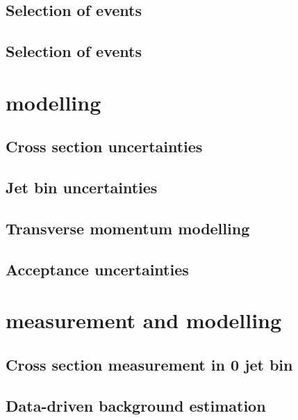 \documentclass[hyper,linkcolor=blue]{mythesis}
\begin{document}
\begin{mainmatter}
    \section{Selection of \WW events}
      \label{sec:presel}
      
    \section{Selection of \HWW events}
      \label{sec:signalregions}
      

  \chapter{\ggH modelling}
    \label{chap:signal}
    
    \section{Cross section uncertainties}
      \label{sec:ggf_xs}
      
    \section{Jet bin uncertainties}
      \label{sec:ggf_jetbin}
      
    \section{Transverse momentum modelling}
      \label{sec:ggf_pt}
      
    \section{Acceptance uncertainties}
      \label{sec:ggf_acc}
      

  \chapter{\WW measurement and modelling}
    \label{chap:ww}
    
    \section{Cross section measurement in 0 jet bin}
      \label{sec:ww_meas}
      
    \section{Data-driven background estimation}
      \label{sec:ww_bkg}
      


\end{mainmatter}
\end{document}
